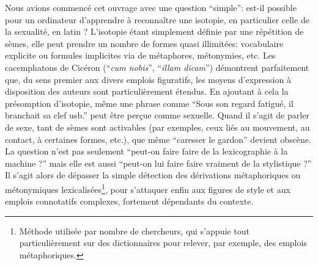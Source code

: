 Nous avions commencé cet ouvrage avec une question \enquote{simple}: est-il possible pour un ordinateur d'apprendre à reconnaître une isotopie, en particulier celle de la sexualité, en latin ? L'isotopie étant simplement définie par une répétition de sèmes, elle peut prendre un nombre de formes quasi illimitées: vocabulaire explicite ou formules implicites via de métaphores, métonymies, etc. Les cacemphatons de Cicéron (\enquote{\textit{cum nobis}}, \enquote{\textit{illam dicam}}) démontrent parfaitement que, du sens premier aux divers emplois figuratifs, les moyens d'expression à disposition des auteurs sont particulièrement étendus. En ajoutant à cela la présomption d'isotopie, même une phrase comme \enquote{Sous son regard fatigué, il branchait sa clef usb.} peut être perçue comme sexuelle. Quand il s'agit de parler de sexe, tant de sèmes sont activables (par exemples, ceux liés au mouvement, au contact, à certaines formes, etc.), que même \enquote{caresser le gardon} devient obscène. La question n'est pas seulement \enquote{peut-on faire faire de la lexicographie à la machine ?} mais elle est aussi \enquote{peut-on lui faire faire vraiment de la stylistique ?} Il s'agit alors de dépasser la simple détection des dérivations métaphoriques ou métonymiques lexicalisées\footnote{Méthode utilisée par nombre de chercheurs, qui s'appuie tout particulièrement sur des dictionnaires pour relever, par exemple, des emplois métaphoriques.}, pour s'attaquer enfin aux figures de style et aux emplois connotatifs complexes, fortement dépendants du contexte.

